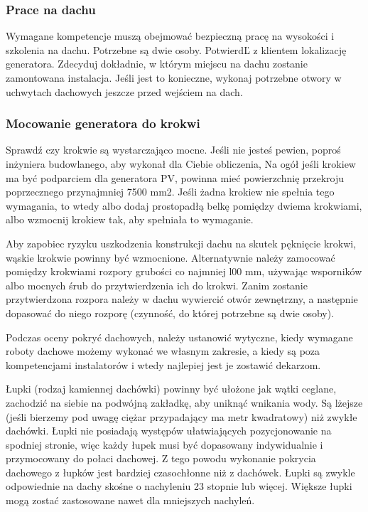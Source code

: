 \documentclass[12pt,a4paper]{article}
\begin{document}
 

\subsubsection{Prace na dachu }
Wymagane kompetencje muszą obejmować bezpieczną pracę na wysokości i 
szkolenia na dachu. Potrzebne są dwie osoby. PotwierdĽ z klientem 
lokalizację generatora. Zdecyduj dokładnie, w którym miejscu na dachu 
zostanie zamontowana instalacja. Jeśli jest to konieczne, wykonaj 
potrzebne otwory w uchwytach dachowych jeszcze przed wejściem na dach. 

 

\subsubsection{Mocowanie generatora do krokwi }


Sprawdź czy krokwie są wystarczająco mocne. Jeśli nie jesteś pewien, 
poproś inżyniera budowlanego, aby wykonał dla Ciebie obliczenia, Na ogół 
jeśli krokiew ma być podparciem dla generatora PV, powinna mieć 
powierzchnię przekroju poprzecznego przynajmniej 7500 mm2. Jeśli żadna 
krokiew nie spełnia tego wymagania, to wtedy albo dodaj prostopadłą 
belkę pomiędzy dwiema krokwiami, albo wzmocnij krokiew tak, aby 
spełniała to wymaganie. 

Aby zapobiec ryzyku uszkodzenia konstrukcji dachu na skutek pęknięcie 
krokwi, wąskie krokwie powinny być wzmocnione. Alternatywnie należy 
zamocować pomiędzy krokwiami rozpory grubości co najmniej l00 mm, 
używając wsporników albo mocnych śrub do przytwierdzenia ich do krokwi. 
Zanim zostanie przytwierdzona rozpora należy w dachu wywiercić otwór 
zewnętrzny, a następnie dopasować do niego rozporę (czynność, do której 
potrzebne są dwie osoby). 


Podczas oceny pokryć dachowych, należy ustanowić wytyczne, kiedy 
wymagane roboty dachowe możemy wykonać we własnym zakresie, a kiedy są 
poza kompetencjami instalatorów i wtedy najlepiej jest je zostawić 
dekarzom. 
 

Łupki (rodzaj kamiennej dachówki) powinny być ułożone jak wątki ceglane, 
zachodzić na siebie na podwójną zakładkę, aby uniknąć wnikania wody. Są 
lżejsze (jeśli bierzemy pod uwagę ciężar przypadający ma metr 
kwadratowy) niż zwykłe dachówki. Łupki nie posiadają występów 
ułatwiających pozycjonowanie na spodniej stronie, więc każdy łupek musi 
być dopasowany indywidualnie i przymocowany do połaci dachowej. Z tego 
powodu wykonanie pokrycia dachowego z łupków jest bardziej czasochłonne 
niż z dachówek. Łupki są zwykle odpowiednie na dachy skośne o nachyleniu 
23 stopnie lub więcej. Większe łupki mogą zostać zastosowane nawet dla 
mniejszych nachyleń. 
\end{document}
